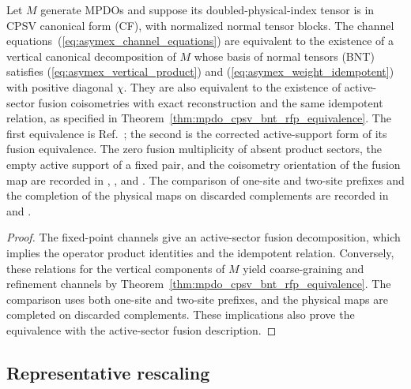 \begin{lemma}
    \label{thm:asymex_rfp_equivalence}
    \leanok
    Let $M$ generate MPDOs and suppose its doubled-physical-index tensor
    is in CPSV canonical form (CF), with normalized normal tensor blocks.
    The channel equations~(\ref{eq:asymex_channel_equations}) are equivalent
    to the existence of a vertical canonical decomposition of $M$ whose
    basis of normal tensors (BNT) satisfies
    (\ref{eq:asymex_vertical_product}) and
    (\ref{eq:asymex_weight_idempotent}) with positive diagonal $\chi$.
    They are also equivalent to the existence of active-sector fusion
    coisometries with exact reconstruction and the same idempotent relation,
    as specified in Theorem~\ref{thm:mpdo_cpsv_bnt_rfp_equivalence}.
    The first equivalence is Ref.~\cite[Theorem~4.14(i)--(ii)]{Cirac2016MPDO_arXiv};
    the second is the corrected active-support form of its fusion equivalence.
    The zero fusion multiplicity of absent product sectors, the empty active
    support of a fixed pair, and the coisometry orientation of the fusion map
    are recorded in \cite{gap:cpsv16_bnt_uniqueness_zero_coefficient},
    \cite{gap:cpsv16_figure11_per_pair_support}, and
    \cite{gap:cpsv16_figure11_fusion_coisometry}. The comparison of one-site
    and two-site prefixes and the completion of the physical maps on
    discarded complements are recorded in
    \cite{gap:cpsv16_two_site_sector_unitary_gauge_gap} and
    \cite{gap:cpgsv17_vertical_isometry_zero_sector}.
\end{lemma}
\begin{proof}
    \leanok
    The fixed-point channels give an active-sector fusion decomposition,
    which implies the operator product identities and the idempotent relation.
    Conversely, these relations for the vertical components of $M$ yield
    coarse-graining and refinement channels by
    Theorem~\ref{thm:mpdo_cpsv_bnt_rfp_equivalence}.
    The comparison uses both one-site and two-site prefixes, and the
    physical maps are completed on discarded complements. These implications
    also prove the equivalence with the active-sector fusion description.
\end{proof}

\subsection{Representative rescaling}%
\label{sec:asymex_rescaling}

